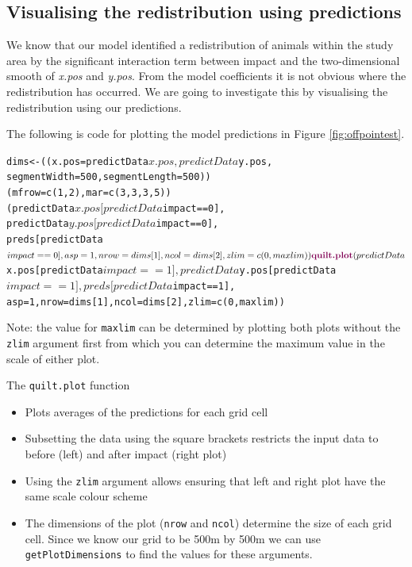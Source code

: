 \subsection{Visualising the redistribution using predictions}
\noindent We know that our model identified a redistribution of animals within the study area by the significant interaction term between impact and the two-dimensional smooth of \textit{x.pos} and \textit{y.pos}. From the model coefficients it is not obvious where the redistribution has occurred. We are going to investigate this by visualising the redistribution using our predictions. 

\noindent The following is code for plotting the model predictions in Figure \ref{fig:offpointest}.
\begin{knitrout}\footnotesize
{}\color{fgcolor}\begin{kframe}
\begin{alltt}
dims<-((x.pos=predictData$x.pos, predictData$y.pos, 
   segmentWidth=500, segmentLength=500))
(mfrow=c(1,2), mar=c(3,3,3,5))
(predictData$x.pos[predictData$impact==0], 
    predictData$y.pos[predictData$impact==0], 
    preds[predictData$impact==0], asp=1, nrow=dims[1], ncol=dims[2], 
    zlim=c(0, maxlim))
\hlfunctioncall{quilt.plot}(predictData$x.pos[predictData$impact==1], 
    predictData$y.pos[predictData$impact==1], preds[predictData$impact==1], 
    asp=1,nrow=dims[1], ncol=dims[2], zlim=c(0, maxlim))
\end{alltt}
\end{kframe}
\end{knitrout}
\noindent Note: the value for {\tt maxlim} can be determined by plotting both plots without the {\tt zlim} argument first from which you can determine the maximum value in the scale of either plot. 
\begin{block}{The {\tt quilt.plot} function}
\begin{itemize}
\item{Plots averages of the predictions for each grid cell}
\item{Subsetting the data using the square brackets restricts the input data to before (left) and after impact (right plot)}
\item{Using the {\tt zlim} argument allows ensuring that left and right plot have the same scale colour scheme}
\item{The dimensions of the plot ({\tt nrow} and {\tt ncol}) determine the size of each grid cell.  Since we know our grid to be 500m by 500m we can use {\tt getPlotDimensions} to find the values for these arguments.}
\end{itemize}
\end{block}

